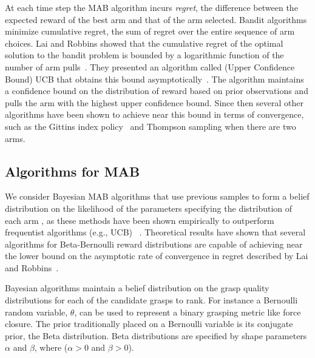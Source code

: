 \documentclass[a4paper, 10pt, conference]{ieeeconf}      %
\begin{document}
At each time step the MAB algorithm incurs \textit{regret}, the difference between the expected reward of the best arm and that of the arm selected. Bandit algorithms minimize cumulative regret, the sum of regret over the entire sequence of arm choices.
Lai and Robbins showed that the cumulative regret of the optimal solution to the bandit problem is bounded by a logarithmic function of the number of arm pulls~\cite{lai1985asymptotically}.
They presented an algorithm called (Upper Confidence Bound) UCB that obtains this bound asymptotically~\cite{lai1985asymptotically}.
The algorithm maintains a confidence bound on the distribution of reward based on prior observations and pulls the arm with the highest upper confidence bound.
Since then several other algorithms have been shown to achieve near this bound in terms of convergence, such as the Gittins index policy~\cite{weber1992gittins} and Thompson sampling when there are two arms\cite{agrawal2011analysis}.

\subsection{Algorithms for MAB}\label{sec:bandit_algorithm}
We consider Bayesian MAB algorithms that use previous samples to form a belief distribution on the likelihood of the parameters specifying the distribution of each arm \cite{weber1992gittins,agrawal2011analysis}, as these methods have been shown empirically to outperform frequentist algorithms (e.g., UCB) ~\cite{chapelle2011empirical, bachman2013greedy}. Theoretical results have shown that several algorithms for Beta-Bernoulli reward distributions are capable of achieving near the lower bound on the asymptotic rate of convergence in regret described by Lai and Robbins~\cite{gittins1983dynamic, agrawal2011analysis, kaufmann2012bayesian}.

Bayesian algorithms maintain a belief distribution on the grasp quality distributions for each of the candidate grasps to rank. For instance a Bernoulli random variable, $\theta$, can be used to represent a binary grasping metric like force closure. The prior traditionally placed on a Bernoulli variable is its conjugate prior, the Beta distribution. 
Beta distributions are specified by shape parameters $\alpha$ and $\beta$, where ($\alpha >0$ and $\beta >0$).
\end{document}
